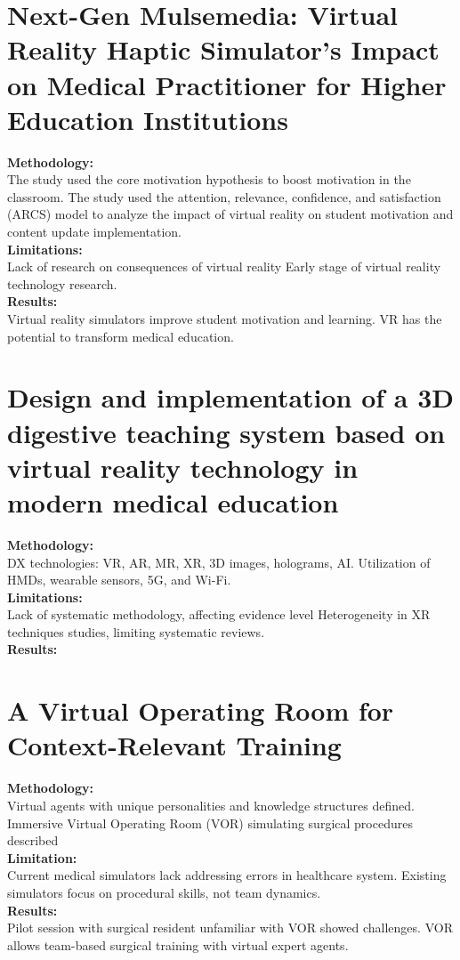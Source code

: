 \section{Next-Gen Mulsemedia: Virtual Reality Haptic Simulator’s Impact on Medical Practitioner for Higher Education Institutions\cite{journalarticle4}\cite{JournalArticle5}\cite{JournalArticle8}}
\textbf{Methodology:}\\ The study used the core motivation hypothesis to boost motivation in the classroom. The study used the attention, relevance, confidence, and satisfaction (ARCS) model to analyze the impact of virtual reality on student motivation and content update implementation.\\
\textbf{Limitations:}\\ Lack of research on consequences of virtual reality
Early stage of virtual reality technology research.\\
\textbf{Results:}\\ Virtual reality simulators improve student motivation and learning. VR has the potential to transform medical education.

\section{Design and implementation of a 3D digestive teaching system based on virtual reality technology in modern medical education\cite{Journal1}}
\textbf{Methodology:}\\
DX technologies: VR, AR, MR, XR, 3D images, holograms, AI. Utilization of HMDs, wearable sensors, 5G, and Wi-Fi.\\
\textbf{Limitations:}\\ Lack of systematic methodology, affecting evidence level
Heterogeneity in XR techniques studies, limiting systematic reviews.\\
\textbf{Results:}\\ 

\section{A Virtual Operating Room for Context-Relevant Training \cite{JournalArticle2}}
\textbf{Methodology:}\\
Virtual agents with unique personalities and knowledge structures defined. Immersive Virtual Operating Room (VOR) simulating surgical procedures described \\
\textbf{Limitation:}\\
Current medical simulators lack addressing errors in healthcare system. Existing simulators focus on procedural skills, not team dynamics.\\
\textbf{Results:}\\ Pilot session with surgical resident unfamiliar with VOR showed challenges. VOR allows team-based surgical training with virtual expert agents.


